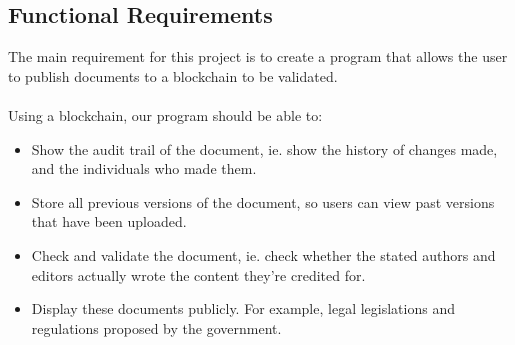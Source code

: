 \newpage
\subsection{Functional Requirements}
The main requirement for this project is to create a program that allows the user to publish documents 
to a blockchain to be validated.
\\ \\Using a blockchain, our program should be able to:

\begin{itemize}
    \item Show the audit trail of the document, ie. show the history of changes made, and the individuals who made them.
    \item Store all previous versions of the document, so users can view past versions that have been uploaded.
    \item Check and validate the document, ie. check whether the stated authors and editors actually wrote 
		  the content they’re credited for.
    \item Display these documents publicly. For example, legal legislations and regulations proposed by the government.
\end{itemize}

